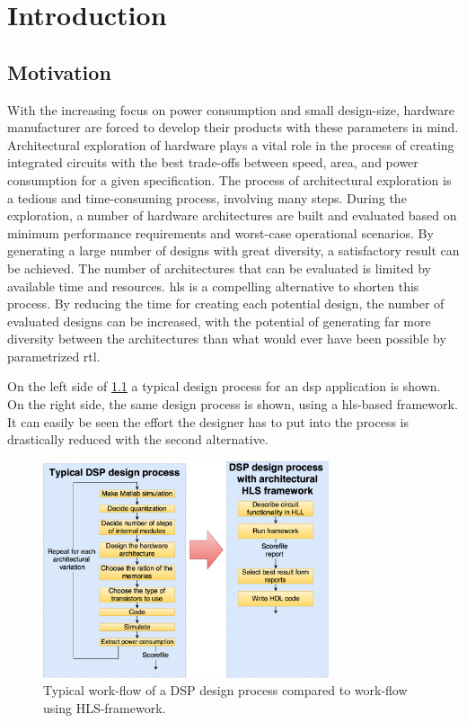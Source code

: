 \chapter{Introduction}
\label{chp:introduction} 
\section{\label{sec:motivation}Motivation}
With the increasing focus on power consumption and small design-size, hardware manufacturer are forced to develop their products with these parameters in mind. Architectural exploration of hardware plays a vital role in the process of creating integrated circuits with the best trade-offs between speed, area, and power consumption for a given specification. The process of architectural exploration is a tedious and time-consuming process, involving many steps. During the exploration, a number of hardware architectures are built and evaluated based on minimum performance requirements and worst-case operational scenarios. By generating a large number of designs with great diversity, a satisfactory result can be achieved. The number of architectures that can be evaluated is limited by available time and resources. \gls{hls} is a compelling alternative to shorten this process. By reducing the time for creating each potential design, the number of evaluated designs can be increased, with the potential of generating far more diversity between the architectures than what would ever have been possible by parametrized \gls{rtl}.

On the left side of \cref{fig:motivationflow} a typical design process for an \gls{dsp} application is shown. On the right side, the same design process is shown, using a \gls{hls}-based framework. It can easily be seen the effort the designer has to put into the process is drastically reduced with the second alternative.

\begin{figure}[hbpt]
\centering
\includegraphics[width=0.75\textwidth]{../figs/Motivation.png}
\caption{\label{fig:motivationflow}Typical work-flow of a DSP design process compared to work-flow using HLS-framework.}
\end{figure}

